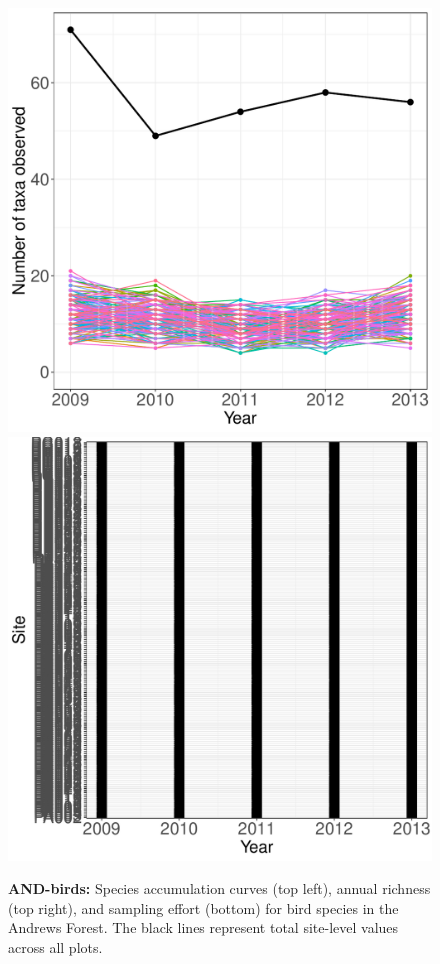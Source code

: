 \documentclass[11pt, oneside]{article}
\begin{document}
\begin{figure}[h!]
\includegraphics[scale = 0.4]{and-birds-wisnoski_num_taxa_over_time.pdf}
\includegraphics[scale = 0.4]{and-birds-wisnoski_spatiotemporal_sampling_effort.pdf}
\caption{{\bf AND-birds:} Species accumulation curves (top left),  annual richness (top right), and sampling effort (bottom) for bird species in the Andrews Forest. The black lines represent total site-level values across all plots.}
\label{and-birds}
\end{figure}
\end{document}
